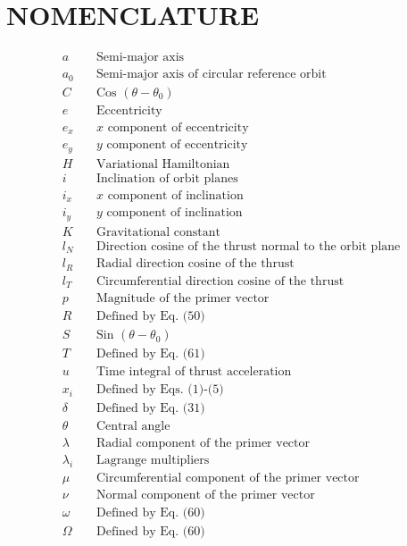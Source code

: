\documentclass[12pt]{article}
\begin{document}
\section*{NOMENCLATURE}
\begin{align*}
a &\quad \text{Semi-major axis} \\
a_0 &\quad \text{Semi-major axis of circular reference orbit} \\
C &\quad \text{Cos } (\theta - \theta_0) \\
e &\quad \text{Eccentricity} \\
e_x &\quad x \text{ component of eccentricity} \\
e_y &\quad y \text{ component of eccentricity} \\
H &\quad \text{Variational Hamiltonian} \\
i &\quad \text{Inclination of orbit planes} \\
i_x &\quad x \text{ component of inclination} \\
i_y &\quad y \text{ component of inclination} \\
K &\quad \text{Gravitational constant} \\
l_{N} &\quad \text{Direction cosine of the thrust normal to the orbit plane} \\
l_{R} &\quad \text{Radial direction cosine of the thrust} \\
l_{T} &\quad \text{Circumferential direction cosine of the thrust} \\
p &\quad \text{Magnitude of the primer vector} \\
R &\quad \text{Defined by Eq. (50)} \\
S &\quad \text{Sin } (\theta - \theta_0) \\
T &\quad \text{Defined by Eq. (61)} \\
u &\quad \text{Time integral of thrust acceleration} \\
x_i &\quad \text{Defined by Eqs. (1)-(5)} \\
\delta &\quad \text{Defined by Eq. (31)} \\
\theta &\quad \text{Central angle} \\
\lambda &\quad \text{Radial component of the primer vector} \\
\lambda_i &\quad \text{Lagrange multipliers} \\
\mu &\quad \text{Circumferential component of the primer vector} \\
\nu &\quad \text{Normal component of the primer vector} \\
\omega &\quad \text{Defined by Eq. (60)} \\
\Omega &\quad \text{Defined by Eq. (60)}
\end{align*}
\end{document}
